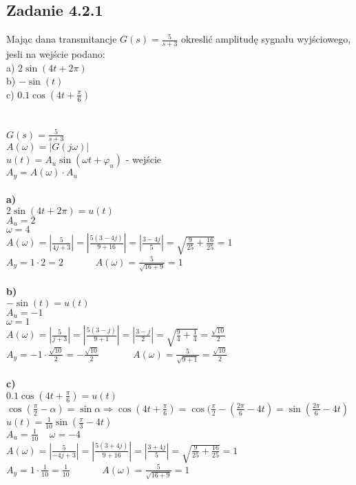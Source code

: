 \subsection*{Zadanie 4.2.1} {\color{darkgray}
	Mając dana transmitancje $G(s)=\frac{5}{s+3}$ okreslić amplitudę sygnału wyjściowego, jesli na wejście podano:\\
	a) $2\sin(4t+2 \pi)$\\
	b) $-\sin(t)$\\
	c) $0.1\cos(4t+\frac\pi 6)$\\
}\lineh
\\\\
$G(s)=\frac{5}{s+3}$\\
$A(\omega)=|G(j\omega)|$\\
$u(t)=A_u\sin(\omega t+\varphi_u )$ - wejście\\
$A_y=A(\omega) \cdot A_u$\\
\\
\textbf{a)}\\
$2\sin(4t+2\pi)=u(t)$\\
$A_u=2$\\
$\omega=4$\\
$A(\omega)=|\frac{5}{4j+3}|=|\frac{5(3-4j)}{9+16}|=|\frac{3-4j}{5}|=\sqrt{\frac{9}{25}+\frac{16}{25}}=1$\\
$A_y=1 \cdot 2 = \boxed{2}$ \ \ \ \ \ \   {\color{lightgray}$A(\omega)=\frac{5}{\sqrt{16+9}}=1$}\\
\\
\textbf{b)}\\
$-\sin(t)=u(t)$\\
$A_u=-1$\\
$\omega=1$\\
$A(\omega)=|\frac{5}{j+3}|=|\frac{5(3-j)}{9+1}|=|\frac{3-j}{2}|=\sqrt{\frac 94+\frac 14}=\frac{\sqrt{10}}{2}$\\
$A_y=-1 \cdot \frac{\sqrt{10}}{2}=\boxed{-\frac{\sqrt{10}}{2}}$\ \ \ \ \ \ \   {\color{lightgray}$A(\omega)=\frac{5}{\sqrt{9+1}}=\frac{\sqrt{10}}{2}$}\\
\\
\textbf{c)}\\
$0.1\cos(4t+\frac\pi 6)=u(t)$\\
$\cos(\frac\pi 2 - \alpha)=\sin \alpha \Rightarrow \cos(4t+\frac \pi 6 ) = \cos (\frac \pi 2 -(\frac{2\pi}{6} - 4t)= \sin(\frac{2\pi}{6}-4t)$\\
$u(t)=\frac{1}{10}\sin(\frac \pi 3 - 4t)$\\
$A_u = \frac{1}{10} \ \ \ \ \ \omega=-4$\\
$A(\omega)=|\frac{5}{-4j+3}|=|\frac{5(3+4j)}{9+16}|=|\frac{3+4j}{5}|=\sqrt{\frac{9}{25}+\frac{16}{25}}=1$\\
$A_y=1 \cdot \frac{1}{10} = \boxed{\frac{1}{10}}$ \ \ \ \ \ \   {\color{lightgray}$A(\omega)=\frac{5}{\sqrt{16+9}}=1$}\\


